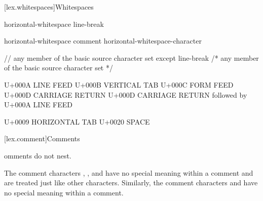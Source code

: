 \documentclass{wg21}
\begin{document}
\begin{addedblock}

[lex.whitespaces]{Whitespaces}

\begin{bnf}
    \br
    horizontal-whitespace\br
    line-break\br
\end{bnf}

\begin{bnf}
    \br
    horizontal-whitespace\br
    comment\br
    horizontal-whitespace-character\br
\end{bnf}

\begin{bnf}
    \br
    \textnormal{// any member of the basic source character set except} line-break\br
    \textnormal{/* any member of the basic source character set */}\br
\end{bnf}

\begin{bnf}
    \br
    \textnormal{U+000A LINE FEED}\br
    \textnormal{U+000B VERTICAL TAB}\br
    \textnormal{U+000C FORM FEED}\br
    \textnormal{U+000D CARRIAGE RETURN}\br
    \textnormal{U+000D CARRIAGE RETURN followed by U+000A LINE FEED}\br
\end{bnf}

\begin{bnf}
    \br
    \textnormal{U+0009 HORIZONTAL TAB}\br
    \textnormal{U+0020 SPACE}\br
\end{bnf}

\end{addedblock}

\begin{removedblock}
[lex.comment]{Comments}
\end{removedblock}
\pnum
{}omments do not nest.
%
\begin{note}
    The comment characters \tcode{//}, \tcode{/*},
    and \tcode{*/} have no special meaning within a \tcode{//} comment and
    are treated just like other characters. Similarly, the comment
    characters \tcode{//} and \tcode{/*} have no special meaning within a
    \tcode{/*} comment.
\end{note}
\end{document}
